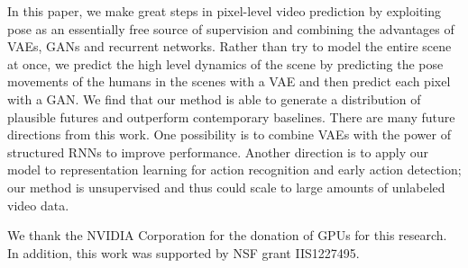 In this paper, we make great steps in pixel-level video prediction by exploiting pose as an essentially free source of supervision and combining the advantages of VAEs, GANs and recurrent networks. Rather than try to model the entire scene at once, we predict the high level dynamics of the scene by predicting the pose movements of the humans in the scenes with a VAE and then predict each pixel with a GAN.
We find that our method is able to generate a distribution of plausible futures and outperform contemporary baselines. There are many future directions from this work. One possibility is to combine VAEs with the power of structured RNNs to improve performance. Another direction is to apply our model to representation learning for action recognition and early action detection; our method is unsupervised and thus could scale to large amounts of unlabeled video data. 

  We thank the NVIDIA Corporation for the donation of GPUs for this research.  In addition, this work was supported by NSF grant IIS1227495.

